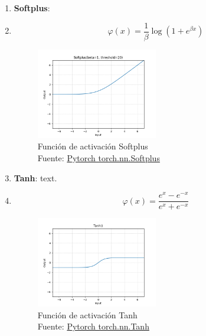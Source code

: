 \begin{enumerate}
    \item \textbf{Softplus}:
    \item[] \begin{equation} \varphi(x) = \frac{1}{\beta} \operatorname*{log}(1+e^{\beta x}) \end{equation}
        \begin{figure}[H]
            \centering
            \includegraphics[width=0.5\textwidth]{figures/equations/Softplus.png}
            \caption{Función de activación Softplus\\Fuente: \href{https://pytorch.org/docs/stable/generated/torch.nn.Softplus.html}{Pytorch torch.nn.Softplus}}
            \label{fig:torch.nn.Softplus}
        \end{figure}

    \item \textbf{Tanh}: text.
    \item[] \begin{equation} \varphi(x) = \frac{e^{x}-e^{-x}}{e^{x}+e^{-x}} \end{equation}
        \begin{figure}[H]
            \centering
            \includegraphics[width=0.5\textwidth]{figures/equations/Tanh.png}
            \caption{Función de activación Tanh\\Fuente: \href{https://pytorch.org/docs/stable/generated/torch.nn.Tanh.html}{Pytorch torch.nn.Tanh}}
            \label{fig:torch.nn.Tanh}
        \end{figure}


\end{enumerate}
